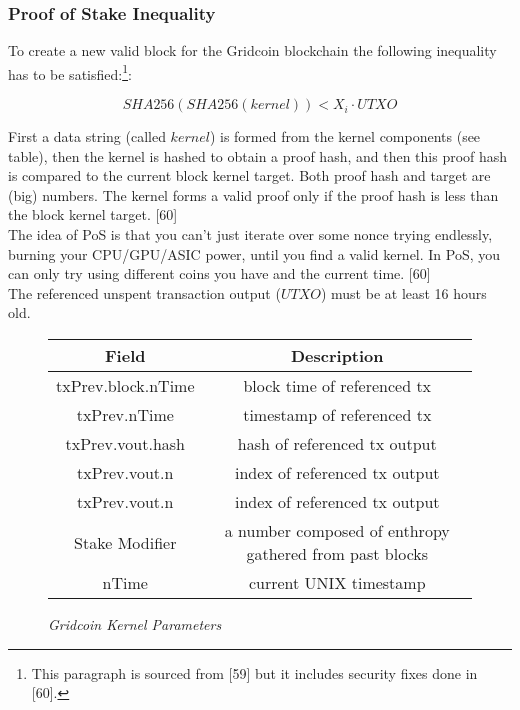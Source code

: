 \subsubsection{Proof of Stake Inequality}

To create a new valid block for the Gridcoin blockchain the following inequality has
to be satisfied:\footnote{This paragraph is sourced from [59] but it includes security fixes done in [60].}:

\begin{equation}
SHA256(SHA256(kernel)) < X_i \cdot UTXO
\end{equation}


First a data string (called $kernel$) is formed from the kernel components (see table), then the kernel is hashed to obtain a proof hash, and then this proof hash is compared to the current block kernel target. Both proof hash and target are (big) numbers. The kernel forms a valid proof only if the proof hash is less than the block kernel target. [60]\\

The idea of PoS is that you can't just iterate over some nonce trying endlessly, burning your CPU/GPU/ASIC power, until you find a valid kernel. In PoS, you can only try using different coins you have and the current time. [60]\\

The referenced unspent transaction output ($UTXO$) must be at least 16 hours old. \\

\begin{center}
\begin{figure}
 \begin{tabular}{||c c||} 
 \hline
 Field & Description \\ [0.5ex] 
 \hline
 txPrev.block.nTime & block time of referenced tx  \\
 \hline
 txPrev.nTime & timestamp of referenced tx  \\
 \hline
 txPrev.vout.hash & hash of referenced tx output  \\
 \hline
 txPrev.vout.n & index of referenced tx output  \\
 \hline
 txPrev.vout.n & index of referenced tx output  \\
 \hline
 Stake Modifier & a number composed of enthropy gathered from past blocks \\
 \hline
 nTime & current UNIX timestamp  \\ [1ex] 
 \hline
\end{tabular}
\medskip
\caption{\textit{Gridcoin Kernel Parameters} }
\end{figure}
\end{center}

